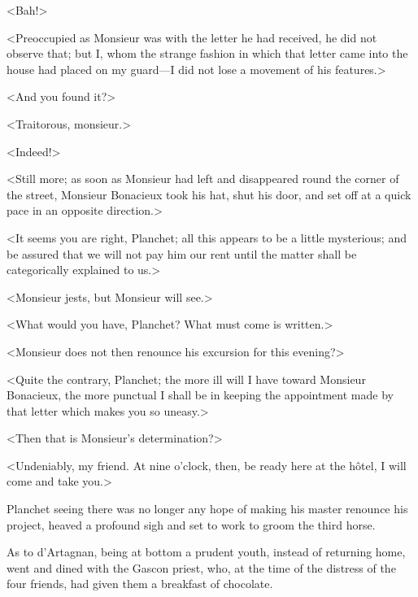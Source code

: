 <Bah!> 

<Preoccupied as Monsieur was with the letter he had received, he did not observe that; but I, whom the strange fashion in which that letter came into the house had placed on my guard---I did not lose a movement of his features.> 

<And you found it?> 

<Traitorous, monsieur.> 

<Indeed!> 

<Still more; as soon as Monsieur had left and disappeared round the corner of the street, Monsieur Bonacieux took his hat, shut his door, and set off at a quick pace in an opposite direction.> 

<It seems you are right, Planchet; all this appears to be a little mysterious; and be assured that we will not pay him our rent until the matter shall be categorically explained to us.> 

<Monsieur jests, but Monsieur will see.> 

<What would you have, Planchet? What must come is written.> 

<Monsieur does not then renounce his excursion for this evening?> 

<Quite the contrary, Planchet; the more ill will I have toward Monsieur Bonacieux, the more punctual I shall be in keeping the appointment made by that letter which makes you so uneasy.> 

<Then that is Monsieur's determination?> 

<Undeniably, my friend. At nine o'clock, then, be ready here at the hôtel, I will come and take you.> 

Planchet seeing there was no longer any hope of making his master renounce his project, heaved a profound sigh and set to work to groom the third horse. 

As to d'Artagnan, being at bottom a prudent youth, instead of returning home, went and dined with the Gascon priest, who, at the time of the distress of the four friends, had given them a breakfast of chocolate. 
